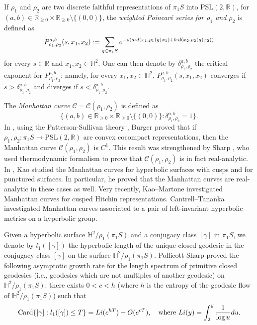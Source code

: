 \documentclass[11pt]{amsart}
\theoremstyle{plain}
\theoremstyle{definition}
\theoremstyle{remark}
\newcommand{\PSL}{\text{PSL}}
\newcommand*{\defeq}{\mathrel{\vcenter{\baselineskip0.5ex \lineskiplimit0pt
			\hbox{\scriptsize.}\hbox{\scriptsize.}}}%
	=}
\begin{document}
If $\rho_1$ and $\rho_2$ are two discrete faithful representations of $\pi_1S$ into $\PSL(2,\mathbb{R})$, for $(a,b) \in \mathbb{R}_{\ge 0}\times \mathbb{R}_{\ge 0}\setminus\{(0,0)\}$,
the {\it weighted Poincar\'e series for $\rho_1$ and $\rho_2$} is defined as
$$P_{\rho_1,\rho_2}^{a,b}(s,x_1,x_2) \defeq \sum_{g \in \pi_1S}e^{-s(a \cdot d(x_1, \rho_1(g) x_1)+b \cdot d(x_2,\rho_2(g) x_2))}$$
for every
$s \in \mathbb{R}$ and $x_1,x_2 \in \mathbb{H}^2$. One can then
denote by $\delta_{\rho_1,\rho_2}^{a,b}$ the critical exponent for $P_{\rho_1,\rho_2}^{a,b}$;
namely,
for every $x_1,x_2 \in \mathbb{H}^2$,
$P_{\rho_1,\rho_2}^{a,b}(s,x_1, x_2)$ converges if $s > \delta_{\rho_1,\rho_2}^{a,b}$
and diverges if $s <\delta_{\rho_1,\rho_2}^{a,b}$.

The {\it Manhattan curve} $\mathcal{C} = \mathcal{C}(\rho_1,\rho_2)$ is defined as
$$\{(a,b) \in \mathbb{R}_{\ge 0}\times \mathbb{R}_{\ge 0}\setminus\{(0,0)\}: \delta_{\rho_1,\rho_2}^{a,b}=1 \}.$$
In \cite{Burger93}, using the
Patterson-Sullivan theory \cite{Patterson76, Sullivan79},
Burger proved that if $\rho_1,\rho_2 \colon \pi_1S \to \PSL(2,\mathbb{R})$ are convex cocompact representations, then the Manhattan curve $\mathcal{C}(\rho_1,\rho_2)$ is $C^1$. This result was strengthened by Sharp \cite{Sharp98}, who 
used thermodynamic formalism to prove that $\mathcal{C}(\rho_1,\rho_2)$ is in fact real-analytic. In \cite{Kao20Manhattan, Kao20}, Kao studied the Manhattan curves for hyperbolic surfaces with cusps and for punctured surfaces. In particular, he proved that the Manhattan curves are real-analytic in these cases as well. Very recently, Kao--Martone \cite{KM24}  investigated Manhattan curves for cusped Hitchin representations. Cantrell--Tananka \cite{CT21}  investigated Manhattan curves associated to a pair of left-invariant hyperbolic metrics on a hyperbolic group.

Given a hyperbolic surface $\mathbb{H}^2/\rho_1(\pi_1S)$ and a conjugacy class $[\gamma]$ in $\pi_1S$, we denote by $l_1([\gamma])$ the hyperbolic length of the unique closed geodesic in the conjugacy class $[\gamma]$ on the surface $\mathbb{H}^2/\rho_1(\pi_1S)$. Pollicott-Sharp \cite{PS98} proved the following asymptotic growth rate for the length spectrum of primitive closed geodesics (i.e., geodesics which are not multiples of another geodesic) on $\mathbb{H}^2/\rho_1(\pi_1S)$: there exists $0<c<h$ 
(where $h$ is the entropy of the geodesic flow of $\mathbb{H}^2/\rho_1(\pi_1S)$)
such that
\begin{equation}\label{eq:intro-1}
{\rm Card} \{[\gamma] : l_1([\gamma]) \le T \} = Li(e^{hT}) +O(e^{cT}),
\quad 
\mbox {where } 
Li(y) = \int_2^y \frac{1}{\log u} du.
\end{equation}
\end{document}
